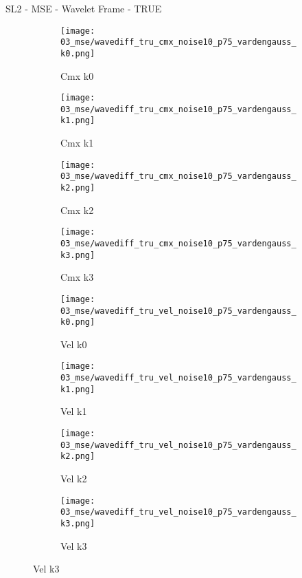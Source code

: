 \documentclass{beamer}
\begin{document}
\begin{frame}{SL2 - MSE - Wavelet Frame - TRUE}{}
\begin{figure}
\begin{subfigure}{0.24\textwidth}
\texttt{[image: 03\_mse/wavediff\_tru\_cmx\_noise10\_p75\_vardengauss\_k0.png]}
\vspace{-20pt}
\caption*{\tiny Cmx k0}
\end{subfigure}
\begin{subfigure}{0.24\textwidth}
\texttt{[image: 03\_mse/wavediff\_tru\_cmx\_noise10\_p75\_vardengauss\_k1.png]}
\vspace{-20pt}
\caption*{\tiny Cmx k1}
\end{subfigure}
\begin{subfigure}{0.24\textwidth}
\texttt{[image: 03\_mse/wavediff\_tru\_cmx\_noise10\_p75\_vardengauss\_k2.png]}
\vspace{-20pt}
\caption*{\tiny Cmx k2}
\end{subfigure}
\begin{subfigure}{0.24\textwidth}
\texttt{[image: 03\_mse/wavediff\_tru\_cmx\_noise10\_p75\_vardengauss\_k3.png]}
\vspace{-20pt}
\caption*{\tiny Cmx k3}
\end{subfigure}

\begin{subfigure}{0.24\textwidth}
\texttt{[image: 03\_mse/wavediff\_tru\_vel\_noise10\_p75\_vardengauss\_k0.png]}
\vspace{-20pt}
\caption*{\tiny Vel k0}
\end{subfigure}
\begin{subfigure}{0.24\textwidth}
\texttt{[image: 03\_mse/wavediff\_tru\_vel\_noise10\_p75\_vardengauss\_k1.png]}
\vspace{-20pt}
\caption*{\tiny Vel k1}
\end{subfigure}
\begin{subfigure}{0.24\textwidth}
\texttt{[image: 03\_mse/wavediff\_tru\_vel\_noise10\_p75\_vardengauss\_k2.png]}
\vspace{-20pt}
\caption*{\tiny Vel k2}
\end{subfigure}
\begin{subfigure}{0.24\textwidth}
\texttt{[image: 03\_mse/wavediff\_tru\_vel\_noise10\_p75\_vardengauss\_k3.png]}
\vspace{-20pt}
\caption*{\tiny Vel k3}
\end{subfigure}
\end{figure}
\end{frame}
\end{document}

